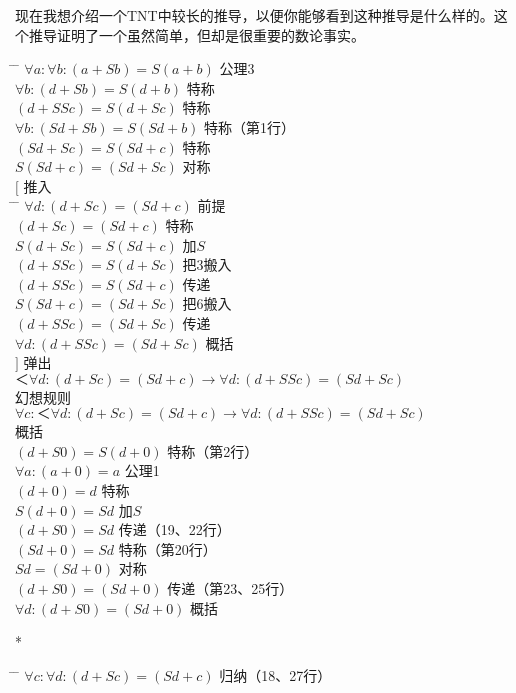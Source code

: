 现在我想介绍一个TNT中较长的推导，以便你能够看到这种推导是什么样的。这个推导证明了一个虽然简单，但却是很重要的数论事实。
\begin{tabbing*}
\qquad\qquad \= \tabindent{-2em} \= \+\kill
$\forall a:\forall b:(a+Sb)=S(a+b)$ \>公理3\\
$\forall b:(d+Sb)=S(d+b)$ \>特称\\
$(d+SSc)=S(d+Sc)$ \>特称\\
$\forall b:(Sd+Sb)=S(Sd+b)$ \>特称（第1行）\\
$(Sd+Sc)=S(Sd+c)$ \>特称\\
$S(Sd+c)=(Sd+Sc)$ \>对称\\
$[$ \>推入\\
\pushtabs
  \quad \= \tabindent{-1em} \= \+\kill
  $\forall d:(d+Sc)=(Sd+c)$ \>前提\\
  $(d+Sc)=(Sd+c)$ \>特称\\
  $S(d+Sc)=S(Sd+c)$ \>加$S$\\
  $(d+SSc)=S(d+Sc)$ \>把3搬入\\
  $(d+SSc)=S(Sd+c)$ \>传递\\
  $S(Sd+c)=(Sd+Sc)$ \>把6搬入\\
  $(d+SSc)=(Sd+Sc)$ \>传递\\
  $\forall d:(d+SSc)=(Sd+Sc)$ \>概括\-\\
\poptabs
$]$ \>弹出\\
$＜\forall d:(d+Sc)=(Sd+c)→\forall d:(d+SSc)=(Sd+Sc)$ \\
  \>幻想规则 \nonumber\\
$\forall c:＜\forall d:(d+Sc)=(Sd+c)→\forall d:(d+SSc)=(Sd+Sc)$ \\
  \>概括 \nonumber\\
$(d+S0)=S(d+0)$ \>特称（第2行）\\
$\forall a:(a+0)=a$ \>公理1\\
$(d+0)=d$ \>特称\\
$S(d+0)=Sd$ \>加$S$\\
$(d+S0)=Sd$ \>传递（19、22行）\\
$(Sd+0)=Sd$ \>特称（第20行）\\
$Sd=(Sd+0)$ \>对称\\
$(d+S0)=(Sd+0)$ \>传递（第23、25行）\\
$\forall d:(d+S0)=(Sd+0)$ \>概括
\end{tabbing*}
\begin{center}
* \quad * \quad * \quad * \quad *
\end{center}
\begin{tabbing*}[]
\qquad\qquad \= \tabindent{-2em} \= \+\kill
$\forall c:\forall d:(d+Sc)=(Sd+c)$ \>归纳（18、27行）
\end{tabbing*}
